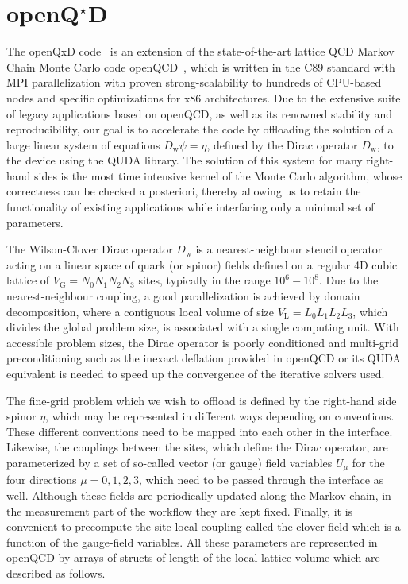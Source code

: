 \chapter{\texorpdfstring{openQ$^\star$D}{openQxD}}
\label{ch:p1:openqxd}

\newcommand{\Dw}{{D_{\mathrm{w}}}}

The openQxD code~\cite{openqxd} is an extension of the state-of-the-art
lattice QCD Markov Chain Monte Carlo code
openQCD~\cite{openqcd,Luscher:2012av}, which is written in the C89 standard
with MPI parallelization with proven strong-scalability to hundreds of
CPU-based nodes and specific optimizations for x86 architectures.
Due to the extensive suite of legacy applications based on openQCD, as well as
its renowned stability and reproducibility, our goal is to accelerate the code
by offloading the solution of a large linear system of equations
$\Dw\psi=\eta$, defined by the Dirac operator $\Dw$, to the
device using the QUDA library.
The solution of this system for many right-hand sides is the most time
intensive kernel of the Monte Carlo algorithm, whose correctness can be
checked a posteriori, thereby allowing us to retain the functionality of
existing applications while interfacing only a minimal set of parameters.

The Wilson-Clover Dirac operator $\Dw$ is a nearest-neighbour stencil operator
acting on a linear space of quark (or spinor) fields defined on a regular 4D
cubic lattice of $V_\mathrm{G}=N_0N_1N_2N_3$ sites, typically in the range $10^6-10^8$.
Due to the nearest-neighbour coupling, a good parallelization is achieved by
domain decomposition, where a contiguous local volume of size $V_\mathrm{L}=L_0L_1L_2L_3$,
which divides the global problem size, is associated with a single computing
unit.
With accessible problem sizes, the Dirac operator is poorly conditioned and
multi-grid preconditioning such as the inexact deflation \cite{Lüscher2007deflation} provided in openQCD
or its QUDA equivalent is needed to speed up the convergence of the iterative
solvers used.

The fine-grid problem which we wish to offload is defined by the right-hand
side spinor $\eta$, which may be represented in different ways depending on 
conventions. These different conventions need to be mapped into each other in the interface.
Likewise, the couplings between the sites, which define the Dirac operator, are
parameterized by a set of so-called vector (or gauge) field variables $U_\mu$
for the four directions $\mu=0,1,2,3$, which need to be passed through the interface as well.
Although these fields are periodically updated along the Markov chain, in
the measurement part of the workflow they are kept fixed.
Finally, it is convenient to precompute the site-local coupling called the
clover-field which is a function of the gauge-field variables.
All these parameters are represented in openQCD by arrays of structs of length of
the local lattice volume which are described as follows.

